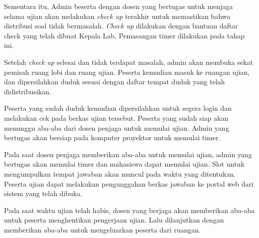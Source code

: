         Sementara itu, Admin beserta dengan dosen yang bertugas untuk menjaga
        selama ujian akan melakukan \textit{check up} terakhir untuk memastikan
        bahwa distribusi soal tidak bermasalah. \textit{Check up} dilakukan
        dengan bantuan daftar check yang telah dibuat Kepala Lab. Pemasangan
        timer dilakukan pada tahap ini.
        
        Setelah \textit{check up} selesai dan tidak terdapat masalah, admin akan
        membuka sekat pemisah ruang lobi dan ruang ujian. Peserta kemudian masuk
        ke ruangan ujian, dan dipersilahkan duduk sesuai dengan daftar tempat
        duduk yang telah didistribusikan.
        
        Peserta yang sudah duduk kemudian dipersilahkan untuk segera login dan
        melakukan cek pada berkas ujian tersebut. Peserta yang sudah siap akan
        menunggu aba-aba dari dosen penjaga untuk memulai ujian. Admin yang
        bertugas akan bersiap pada komputer proyektor untuk memulai timer.
        
        Pada saat dosen penjaga memberikan aba-aba untuk memulai ujian, admin
        yang bertugas akan memulai timer dan mahasiswa dapat memulai ujian. Slot
        untuk mengumpulkan tempat jawaban akan muncul pada waktu yang
        ditentukan. Peserta ujian dapat melakukan pengunggahan berkas jawaban ke
        portal web dari sistem yang telah dibuka.
        
        Pada saat waktu ujian telah habis, dosen yang berjaga akan memberikan
        aba-aba untuk peserta menghentikan pengerjaan ujian. Lalu dilanjutkan
        dengan memberikan aba-aba untuk mengeluarkan peserta dari ruangan.
    
